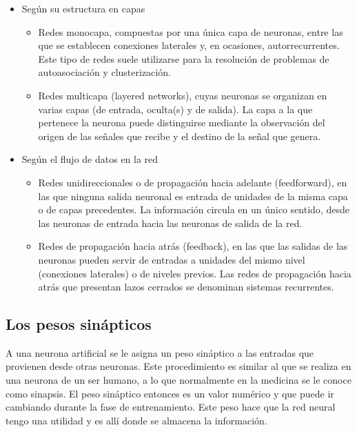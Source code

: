 \begin{itemize}
\item Según su estructura en capas
\begin{itemize}
  \item Redes monocapa, compuestas por una única capa de neuronas, entre las que se establecen conexiones laterales y, en ocasiones, autorrecurrentes. Este tipo de redes suele utilizarse para la resolución de problemas de autoasociación y clusterización.

  \item Redes multicapa (layered networks), cuyas neuronas se organizan en varias capas (de entrada, oculta(s) y de salida). La capa a la que pertenece la neurona puede distinguirse mediante la observación del origen de las señales que recibe y el destino de la señal que genera.
\end{itemize}

\item Según el flujo de datos en la red

\begin{itemize}
  \item Redes unidireccionales o de propagación hacia adelante (feedforward), en las que ninguna salida neuronal es entrada de unidades de la misma capa o de capas precedentes. La información circula en un único sentido, desde las neuronas de entrada hacia las neuronas de salida de la red.

  \item Redes de propagación hacia atrás (feedback), en las que las salidas de las neuronas pueden servir de entradas a unidades del mismo nivel (conexiones laterales) o de niveles previos. Las redes de propagación hacia atrás que presentan lazos cerrados se denominan sistemas recurrentes.
\end{itemize}
\end{itemize}
\subsection{Los pesos sinápticos}
A una neurona artificial se le asigna un peso sináptico a las entradas que provienen desde otras neuronas\cite{acevedo2017principios}. Este procedimiento es similar al que se realiza en una neurona de un ser humano, a lo que normalmente en la medicina se le conoce como sinapsis. El peso sináptico entonces es un valor numérico y que puede ir cambiando durante la fase de entrenamiento. Este peso hace que la red neural tengo una utilidad y es allí donde se almacena la información.

